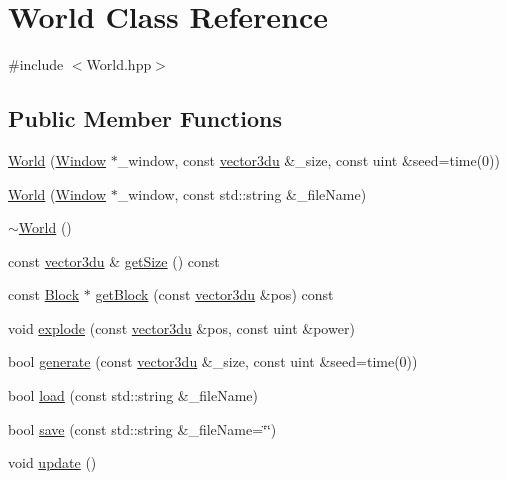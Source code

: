 \hypertarget{class_world}{}\section{World Class Reference}
\label{class_world}


{\ttfamily \#include $<$World.\+hpp$>$}

\subsection*{Public Member Functions}
\begin{DoxyCompactItemize}
\item 
\mbox{\hyperlink{class_world_a4e50a05db3a33ba840e97513c533370d}{World}} (\mbox{\hyperlink{class_window}{Window}} $\ast$\+\_\+window, const \mbox{\hyperlink{_utility_8hpp_ac675fa2b6c79d0be47ae76e5d0ce38a8}{vector3du}} \&\+\_\+size, const uint \&seed=time(0))
\item 
\mbox{\hyperlink{class_world_a132e6d6a7b665882b07d8208f7f2feca}{World}} (\mbox{\hyperlink{class_window}{Window}} $\ast$\+\_\+window, const std\+::string \&\+\_\+file\+Name)
\item 
\mbox{\hyperlink{class_world_a8c73fba541a5817fff65147ba47cd827}{$\sim$\+World}} ()
\item 
const \mbox{\hyperlink{_utility_8hpp_ac675fa2b6c79d0be47ae76e5d0ce38a8}{vector3du}} \& \mbox{\hyperlink{class_world_a967df6dfad453fec941be8df521dca15}{get\+Size}} () const
\item 
const \mbox{\hyperlink{class_block}{Block}} $\ast$ \mbox{\hyperlink{class_world_ad9c5dd128373fd90b8e644355f64ae5a}{get\+Block}} (const \mbox{\hyperlink{_utility_8hpp_ac675fa2b6c79d0be47ae76e5d0ce38a8}{vector3du}} \&pos) const
\item 
void \mbox{\hyperlink{class_world_affc0ca196e8806697260336c57f53d6e}{explode}} (const \mbox{\hyperlink{_utility_8hpp_ac675fa2b6c79d0be47ae76e5d0ce38a8}{vector3du}} \&pos, const uint \&power)
\item 
bool \mbox{\hyperlink{class_world_a9f9fb4301a1f96649db884f6ce7f3e25}{generate}} (const \mbox{\hyperlink{_utility_8hpp_ac675fa2b6c79d0be47ae76e5d0ce38a8}{vector3du}} \&\+\_\+size, const uint \&seed=time(0))
\item 
bool \mbox{\hyperlink{class_world_ac9eb168d9faee4243edbee43b8a769bb}{load}} (const std\+::string \&\+\_\+file\+Name)
\item 
bool \mbox{\hyperlink{class_world_a589deeba74f3e6cfab5ab4427c4255ed}{save}} (const std\+::string \&\+\_\+file\+Name=\char`\"{}\char`\"{})
\item 
void \mbox{\hyperlink{class_world_aac8c1fde63c06577ffc648aaefdb37f0}{update}} ()
\end{DoxyCompactItemize}


